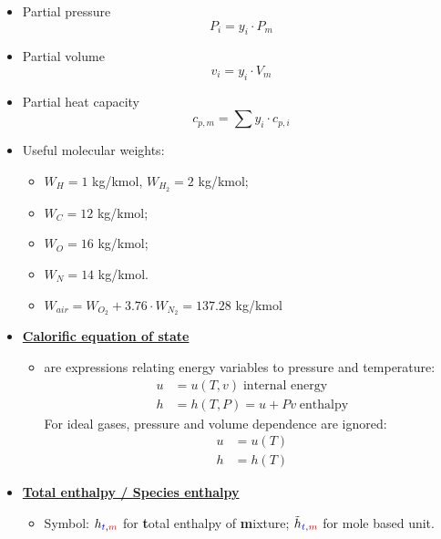 \begin{itemize}
    \item Partial pressure
    \begin{equation*}
        P_i = y_i \cdot P_m
    \end{equation*}
    \item Partial volume
    \begin{equation*}
        v_i = y_i \cdot V_m
    \end{equation*}
    \item Partial heat capacity
    \begin{equation*}
        c_{p,m} = \sum y_i \cdot c_{p,i}
    \end{equation*}
    \item Useful molecular weights:
    \begin{itemize}
        \item $W_H = 1$ kg/kmol, $W_{H_2} = 2$ kg/kmol;
        \item $W_C = 12$ kg/kmol;
        \item $W_O = 16$ kg/kmol;
        \item $W_N = 14$ kg/kmol.
        \item $W_{air} = W_{O_2} + 3.76\cdot W_{N_2} = 137.28$ kg/kmol
    \end{itemize}
    \item {\color{blue}\textbf{\ul{Calorific equation of state}}}
    \begin{itemize}
        \item are expressions relating energy variables to pressure and temperature:
        \begin{align*}
            u &= u (T,v) \; \text{internal energy} \\
            h &= h (T,P) = u + Pv \; \text{enthalpy}
        \end{align*}
        For ideal gases, pressure and volume dependence are ignored:
        \begin{align*}
            u &= u(T) \\
            h &= h(T)
        \end{align*}
    \end{itemize}
    \item {\color{blue}\textbf{\ul{Total enthalpy / Species enthalpy}}}
    \begin{itemize}
        \item Symbol: $h_{{\color{blue}t},{\color{red}m}}$ for {\color{blue}\textbf{t}}otal enthalpy of {\color{red}\textbf{m}}ixture; $\tilde{h}_{{\color{blue}t},{\color{red}m}}$ for mole based unit.

\end{itemize}
\end{itemize}
